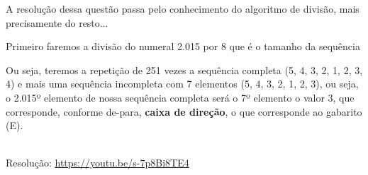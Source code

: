 \noindent {}

A resolução dessa questão passa pelo conhecimento do algoritmo de divisão, mais precisamente do resto...

Primeiro faremos a divisão do numeral 2.015 por 8 que é o tamanho da sequência 


Ou seja, teremos a repetição de 251 vezes a sequência completa (5, 4, 3, 2, 1, 2, 3, 4) e mais uma sequência incompleta com 7 elementos (5, 4, 3, 2, 1, 2, 3), ou seja, o 2.015º elemento de nossa sequência completa será o 7º elemento o valor 3, que corresponde, conforme de-para, \textbf{caixa de direção}, o que corresponde ao gabarito (E). 



\begin{center}
    \href{https://youtu.be/s-7p8Bi8TE4}{
    }\\
    Resolução: \url{https://youtu.be/s-7p8Bi8TE4}
\end{center}